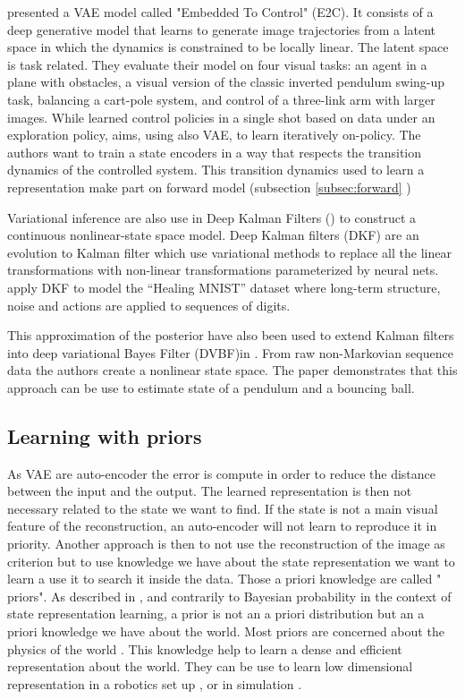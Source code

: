 \documentclass[a4paper]{article}
\begin{document}
 \cite{Watter15} presented a VAE model called "Embedded To Control" (E2C). It consists of a deep generative model that learns to generate image trajectories from a latent space in which the dynamics is constrained to be locally linear. The latent space is task related. They evaluate their model on four visual tasks: an agent in a plane with obstacles, a visual version of the classic inverted pendulum swing-up task, balancing a cart-pole system, and control of a three-link arm with larger images. While \cite{Watter15} learned control policies in a single shot based on data under an exploration policy, \cite{Hoof16} aims, using also VAE, to learn iteratively on-policy. The authors want to train a state encoders in a way that respects the transition dynamics of the controlled system. This transition dynamics used to learn a representation make \cite{Hoof16} part on forward model (subsection \ref{subsec:forward} )

Variational inference are also use in Deep Kalman Filters (\cite{Krishnan15}) to construct a continuous nonlinear-state space model. Deep Kalman filters (DKF) are an evolution to Kalman filter which use variational methods to replace all the linear transformations with non-linear transformations parameterized by neural nets. \cite{Krishnan15} apply DKF to model the “Healing MNIST” dataset where long-term structure, noise and actions are applied to sequences of digits. 


This approximation of the posterior have also been used to extend Kalman filters into deep variational Bayes Filter (DVBF)in \cite{Karl16}. From  raw non-Markovian sequence data the authors create a nonlinear state space. The paper demonstrates that this approach can be use to estimate state of a pendulum and a bouncing ball.

\subsection{ Learning with priors}
As VAE are auto-encoder the error is compute in order to reduce the distance between the input and the output. The learned representation is then not necessary related to the state we want to find. If the state is not a main visual feature of the reconstruction, an auto-encoder will not learn to reproduce it in priority. Another approach is then to not use the reconstruction of the image as criterion but to use knowledge we have about the state representation we want to learn a use it to search it inside the data. Those a priori knowledge are called " priors". As described in \cite{Bengio12}, and contrarily to Bayesian probability in the context of state representation learning, a prior is not an a priori distribution but an a priori knowledge we have about the world. Most priors are concerned about the physics of the world \cite{Scholz14}. This knowledge help to learn a dense and efficient representation about the world. They can be use to learn low dimensional representation in a robotics set up \cite{Jonschkowski15}, or in simulation \cite{Jonschkowski17}.
\end{document}
